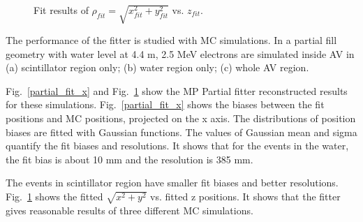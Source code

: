\documentclass[preprint,12pt]{elsarticle}
\numberwithin{equation}{section}
\begin{document}
\begin{figure}[htbp]
{\begin{minipage}[t]{0.38\textwidth}
		\end{minipage}
	}
	\caption{Fit results of $\rho_{fit}=\sqrt{x_{fit}^2+y_{fit}^2}$ vs. $z_{fit}$.}
	\label{partial_fit_rz}
\end{figure}

The performance of the fitter is studied with MC simulations. In a partial fill geometry with water level at 4.4 m, 2.5 MeV electrons are simulated inside AV in (a) scintillator region only; (b) water region only; (c) whole AV region.

Fig.~\ref{partial_fit_x} and Fig.~\ref{partial_fit_rz} show the MP Partial fitter reconstructed results for these simulations. Fig.~\ref{partial_fit_x} shows the biases between the fit positions and MC positions, projected on the x axis. The distributions of position biases are fitted with Gaussian functions. The values of Gaussian mean and sigma quantify the fit biases and resolutions. It shows that for the events in the water, the fit bias is about 10 mm and the resolution is 385 mm.



The events in scintillator region have  smaller fit biases and better resolutions. Fig.~\ref{partial_fit_rz} shows the fitted $\sqrt{x^2+y^2}$ vs. fitted z positions. It shows that the fitter gives reasonable results of three different MC simulations. 
\end{document}
